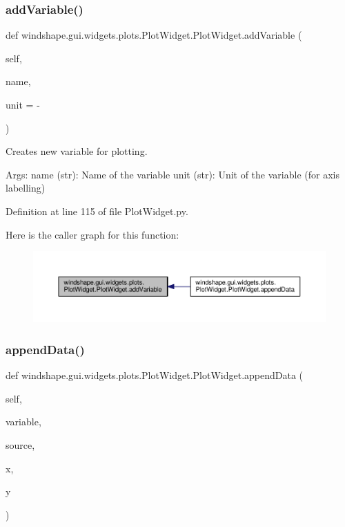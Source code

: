 \subsubsection{\texorpdfstring{add\+Variable()}{addVariable()}}
{\footnotesize\ttfamily def windshape.\+gui.\+widgets.\+plots.\+Plot\+Widget.\+Plot\+Widget.\+add\+Variable (\begin{DoxyParamCaption}\item[{}]{self,  }\item[{}]{name,  }\item[{}]{unit = {\ttfamily \textquotesingle{}-\/\textquotesingle{}} }\end{DoxyParamCaption})}

\begin{DoxyVerb}Creates new variable for plotting.

Args:
    name (str): Name of the variable
    unit (str): Unit of the variable (for axis labelling)
\end{DoxyVerb}
 

Definition at line 115 of file Plot\+Widget.\+py.

Here is the caller graph for this function\+:\nopagebreak
\begin{figure}[H]
\begin{center}
\leavevmode
\includegraphics[width=350pt]{classwindshape_1_1gui_1_1widgets_1_1plots_1_1_plot_widget_1_1_plot_widget_a8516110c825f05cd3cc8f5c661953cb1_icgraph}
\end{center}
\end{figure}
\mbox{\label{classwindshape_1_1gui_1_1widgets_1_1plots_1_1_plot_widget_1_1_plot_widget_a122553b70fe15d951e9314a7881be4d4}} 
\subsubsection{\texorpdfstring{append\+Data()}{appendData()}}
{\footnotesize\ttfamily def windshape.\+gui.\+widgets.\+plots.\+Plot\+Widget.\+Plot\+Widget.\+append\+Data (\begin{DoxyParamCaption}\item[{}]{self,  }\item[{}]{variable,  }\item[{}]{source,  }\item[{}]{x,  }\item[{}]{y }\end{DoxyParamCaption})}

